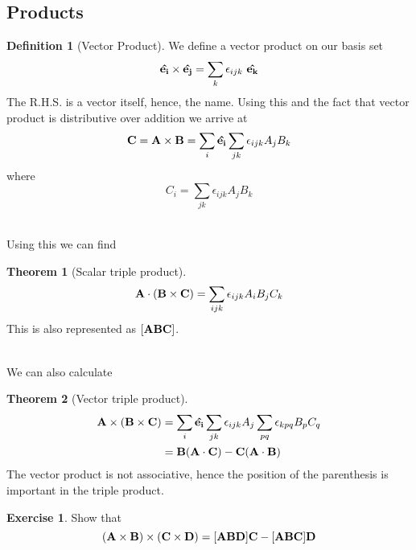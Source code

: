 \documentclass[10pt, a4paper]{extarticle}
\theoremstyle{definition}
\newtheorem{thm}{Theorem}
\newtheorem{defn}{Definition}
\newtheorem{ex}{Exercise}
\begin{document}
\subsection{Products}
\begin{framed}
	\begin{defn}[Vector Product]
		We define a vector product on our basis set
		\[\vu{e_i}\times\vu{e_j}=\sum_k \epsilon_{ijk}\ \vu{e_k}\]
		The R.H.S. is a vector itself, hence, the name. Using this and the fact that vector product is distributive over addition we arrive at
		\[\vb{C}=\vb{A}\times\vb{B}=\sum_i \vu{e_i}\sum_{jk}\epsilon_{ijk}A_jB_k\]
		where \[C_i=\sum_{jk}\epsilon_{ijk}A_jB_k\]
	\end{defn}
\end{framed}
\hfill\\
Using this we can find
\begin{framed}
	\begin{thm}[Scalar triple product]
		\[\vb{A}\cdot(\vb{B}\times\vb{C})=\sum_{ijk}\epsilon_{ijk}A_iB_jC_k\]
		This is also represented as $[\vb{ABC}]$.
	\end{thm}
\end{framed}
\hfill\\
We can also calculate
\begin{framed}
	\begin{thm}[Vector triple product]
		\begin{align*}
			\vb{A}\times(\vb{B}\times\vb{C}) & =\sum_i \vu{e_i}\sum_{jk}\epsilon_{ijk}A_j\sum_{pq}\epsilon_{kpq}B_pC_q \\
			                                 & =\vb{B}(\vb{A}\cdot\vb{C})-\vb{C}(\vb{A}\cdot\vb{B})
		\end{align*}
		The vector product is not associative, hence the position of the parenthesis is important in the triple product.
	\end{thm}
\end{framed}

\begin{ex}
	Show that
	\[(\vb{A}\times\vb{B})\times(\vb{C}\times\vb{D})=[\vb{ABD}]\vb{C}-[\vb{ABC}]\vb{D}\]
\end{ex}
\end{document}
